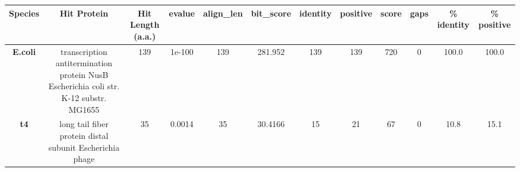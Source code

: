 \begin{tabular}{|c|c|c|c|c|c|c|c|c|c|c|c|} \hline
\textbf{Species} & \textbf{Hit Protein} & \textbf{Hit Length (a.a.)} & \textbf{evalue} & \textbf{align\_len} & \textbf{bit\_score} & \textbf{identity} & \textbf{positive} & \textbf{score} & \textbf{gaps} & \textbf{\% identity} & \textbf{\% positive} \\ \hline
\textbf{E.coli} & transcription antitermination protein NusB Escherichia coli str. K-12 substr. MG1655 & 139 & 1e-100 & 139 & 281.952 & 139 & 139 & 720 & 0 & 100.0 & 100.0\\
\textbf{t4} & long tail fiber protein distal subunit Escherichia phage  & 35 & 0.0014 & 35 & 30.4166 & 15 & 21 & 67 & 0 & 10.8 & 15.1\\
\hline \end{tabular}

